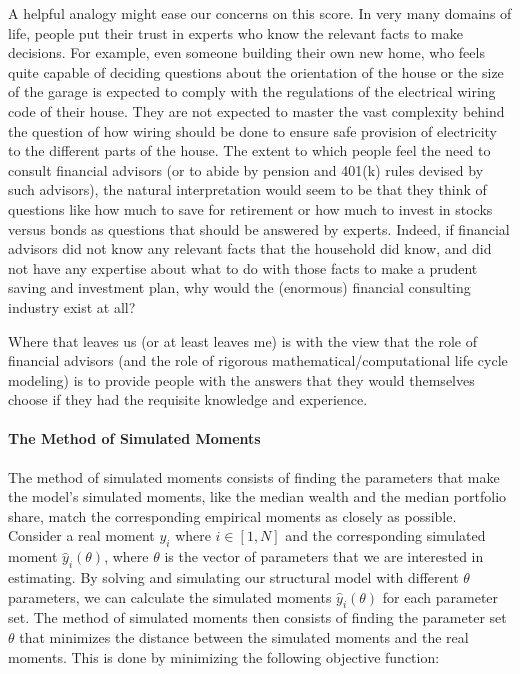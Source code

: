 \documentclass{article}
\begin{document}
A helpful analogy might ease our concerns on this score. In very many domains of life, people put their trust in experts who know the relevant facts to make decisions. For example, even someone building their own new home, who feels quite capable of deciding questions about the orientation of the house or the size of the garage is expected to comply with the regulations of the electrical wiring code of their house. They are not expected to master the vast complexity behind the question of how wiring should be done to ensure safe provision of electricity to the different parts of the house. The extent to which people feel the need to consult financial advisors (or to abide by pension and 401(k) rules devised by such advisors), the natural interpretation would seem to be that they think of questions like how much to save for retirement or how much to invest in stocks versus bonds as questions that should be answered by experts. Indeed, if financial advisors did not know any relevant facts that the household did know, and did not have any expertise about what to do with those facts to make a prudent saving and investment plan, why would the (enormous) financial consulting industry exist at all?

Where that leaves us (or at least leaves me) is with the view that the role of financial advisors (and the role of rigorous mathematical/computational life cycle modeling) is to provide people with the answers that they would themselves choose if they had the requisite knowledge and experience.


\paragraph{The Method of Simulated Moments}

The method of simulated moments consists of finding the parameters that make the model's simulated moments, like the median wealth and the median portfolio share, match the corresponding empirical moments as closely as possible. Consider a real moment $y_i$ where $i \in [1, N]$ and the corresponding simulated moment $\hat{y}_i(\theta)$, where $\theta$ is the vector of parameters that we are interested in estimating. By solving and simulating our structural model with different $\theta$ parameters, we can calculate the simulated moments $\hat{y}_i(\theta)$ for each parameter set. The method of simulated moments then consists of finding the parameter set $\theta$ that minimizes the distance between the simulated moments and the real moments. This is done by minimizing the following objective function:
\end{document}
